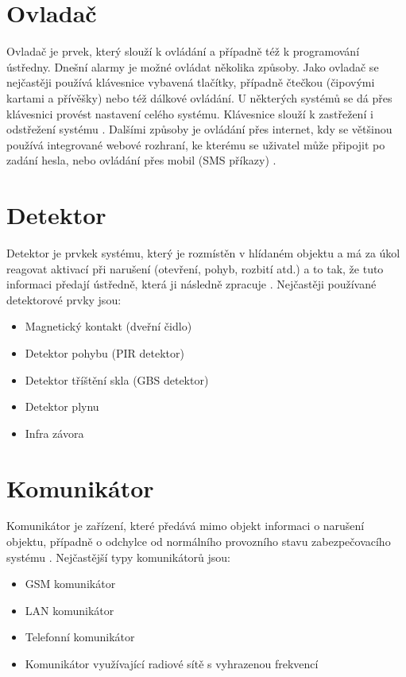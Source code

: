 \documentclass[FM,MP]{tulthesis}  %
\begin{document}
\section{Ovladač}
Ovladač je prvek, který slouží k ovládání a případně též k programování ústředny. Dnešní alarmy je možné ovládat několika způsoby. Jako ovladač se nejčastěji používá klávesnice vybavená tlačítky, případně čtečkou (čipovými kartami a přívěšky) nebo též dálkové ovládání. U některých systémů se dá přes klávesnici provést nastavení celého systému. Klávesnice slouží k zastřežení i odstřežení systému \cite{Electronic security signalisation}. Dalšími způsoby je ovládání přes internet, kdy se většinou používá integrované webové rozhraní, ke kterému se uživatel může připojit po zadání hesla, nebo ovládání přes mobil (SMS příkazy) \cite{Bachelor thesis}.

\section{Detektor}
Detektor je prvkek systému, který je rozmístěn v hlídaném objektu a má za úkol reagovat aktivací při narušení (otevření, pohyb, rozbití atd.) a to tak, že tuto informaci předají ústředně, která ji následně zpracuje \cite{Electronic security signalisation}. Nejčastěji používané detektorové prvky jsou:

\begin{itemize}
\item Magnetický kontakt (dveřní čidlo)
\item Detektor pohybu (PIR detektor)
\item Detektor tříštění skla (GBS detektor)
\item Detektor plynu
\item Infra závora
\end{itemize} 

\section{Komunikátor}
Komunikátor je zařízení, které předává mimo objekt informaci o narušení objektu, případně o odchylce od normálního provozního stavu zabezpečovacího systému \cite{Electronic security signalisation}. Nejčastější typy komunikátorů jsou:

\begin{itemize}
\item GSM komunikátor
\item LAN komunikátor
\item Telefonní komunikátor
\item Komunikátor využívající radiové sítě s vyhrazenou frekvencí
\end{itemize} 
\end{document}
